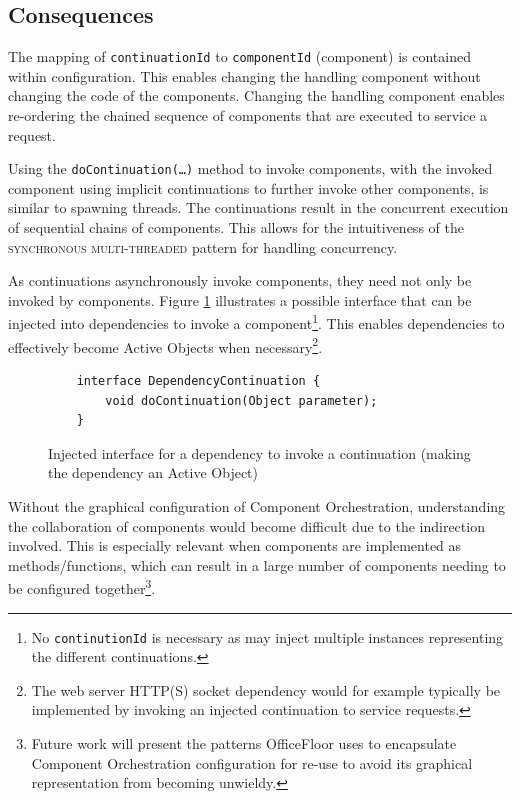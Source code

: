\documentclass[prodmode]{style/acmlarge}
\begin{document}
\subsection{Consequences}

The mapping of \texttt{continuationId} to \texttt{componentId} (component) is
contained within configuration.  This enables changing the handling component
without changing the code of the components.  Changing the handling component
enables re-ordering the chained sequence of components that are executed to
service a request.

Using the \texttt{doContinuation(\ldots)} method to invoke components, with the
invoked component using implicit continuations to further invoke other
components, is similar to spawning threads.  The continuations result in the
concurrent execution of sequential chains of components.  This allows for the
intuitiveness of the \textsc{synchronous multi-threaded} pattern \cite{proactor}
for handling concurrency.

As continuations asynchronously invoke components, they need not only be invoked
by components. Figure \ref{fig:DC_interface} illustrates a possible interface
that can be injected into dependencies to invoke a component\footnote{No
\texttt{continutionId} is necessary as may inject multiple instances
representing the different continuations.}.  This enables dependencies to
effectively become Active Objects \cite{active-object} when
necessary\footnote{The web server HTTP(S) socket dependency would for example
typically be implemented by invoking an injected continuation to service
requests.}.

\begin{figure}[tp]
\begin{verbatim}
    interface DependencyContinuation {
        void doContinuation(Object parameter);
    }
\end{verbatim}
\caption{Injected interface for a dependency to invoke a continuation (making the dependency an Active Object)}
\label{fig:DC_interface}
\end{figure}

Without the graphical configuration of Component Orchestration, understanding
the collaboration of components would become difficult due to the indirection
involved.  This is especially relevant when components are implemented as
methods/functions, which can result in a large number of components needing to
be configured together\footnote{Future work will present the patterns
OfficeFloor \cite{officefloor} uses to encapsulate Component Orchestration
configuration for re-use to avoid its graphical representation from becoming
unwieldy.}.
\end{document}
